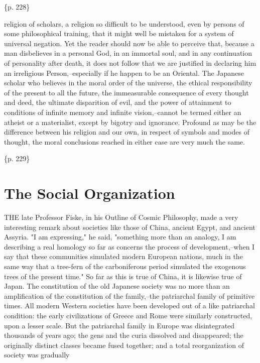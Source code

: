 \{p. 228\}

religion of scholars, a religion so difficult to be understood, even by persons of some philosophical training, that it might well be mistaken for a system of universal negation. Yet the reader should now be able to perceive that, because a man disbelieves in a personal God, in an immortal soul, and in any continuation of personality after death, it does not follow that we are justified in declaring him an irreligious Person,--especially if he happen to be an Oriental. The Japanese scholar who believes in the moral order of the universe, the ethical responsibility of the present to all the future, the immeasurable consequence of every thought and deed, the ultimate disparition of evil, and the power of attainment to conditions of infinite memory and infinite vision,--cannot be termed either an atheist or a materialist, except by bigotry and ignorance. Profound as may be the difference between his religion and our own, in respect of symbols and modes of thought, the moral conclusions reached in either case are very much the same.

\{p. 229\}

\section{The Social Organization}
\label{sec:orgee14b36}

THE late Professor Fiske, in his Outline of Cosmic Philosophy, made a very interesting remark about societies like those of China, ancient Egypt, and ancient Assyria. "I am expressing," he said, "something more than an analogy, I am describing a real homology so far as concerns the process of development,--when I say that these communities simulated modern European nations, much in the same way that a tree-fern of the carboniferous period simulated the exogenous trees of the present time." So far as this is true of China, it is likewise true of Japan. The constitution of the old Japanese society was no more than an amplification of the constitution of the family,--the patriarchal family of primitive times. All modern Western societies have been developed out of a like patriarchal condition: the early civilizations of Greece and Rome were similarly constructed, upon a lesser scale. But the patriarchal family in Europe was disintegrated thousands of years ago; the gens and the curia dissolved and disappeared; the originally distinct classes became fused together; and a total reorganization of society was gradually

